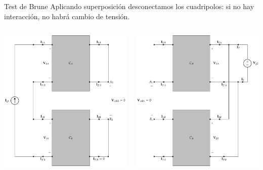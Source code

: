 \documentclass[xcolor={usenames,svgnames,dvipsnames}]{beamer}
\begin{document}
\begin{frame}[label={sec:org0866253},plain]{Test de Brune}
Aplicando superposición desconectamos los cuadripolos: \alert{si no hay interacción, no habrá cambio de tensión}.
\begin{columns}
\begin{column}{0.65\columnwidth}
\begin{center}
\includegraphics[width=.9\linewidth]{../figs/serie-paralelo-brune-entrada.pdf}
\end{center}
\end{column}
\begin{column}{0.65\columnwidth}
\begin{center}
\includegraphics[width=.9\linewidth]{../figs/serie-paralelo-brune-salida.pdf}
\end{center}
\end{column}
\end{columns}
\end{frame}
\end{document}
